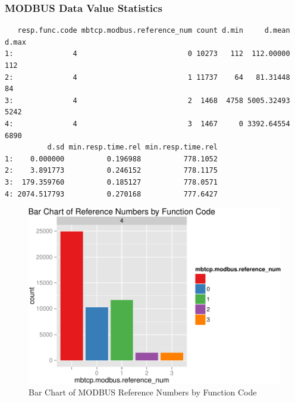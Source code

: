 \documentclass[12pt,]{article}
\begin{document}
\pagebreak

\subsubsection{MODBUS Data Value
Statistics}\label{modbus-data-value-statistics}

\begin{verbatim}
   resp.func.code mbtcp.modbus.reference_num count d.min     d.mean d.max
1:              4                          0 10273   112  112.00000   112
2:              4                          1 11737    64   81.31448    84
3:              4                          2  1468  4758 5005.32493  5242
4:              4                          3  1467     0 3392.64554  6890
          d.sd min.resp.time.rel min.resp.time.rel
1:    0.000000          0.196988          778.1052
2:    3.891773          0.246152          778.1175
3:  179.359760          0.185127          778.0571
4: 2074.517793          0.270168          777.6427
\end{verbatim}

\begin{figure}

{\centering \includegraphics{thesis_files/figure-latex/unnamed-chunk-33-1} 

}

\caption{Bar Chart of MODBUS Reference Numbers by Function Code}\label{fig:unnamed-chunk-33}
\end{figure}

\newpage
\end{document}
